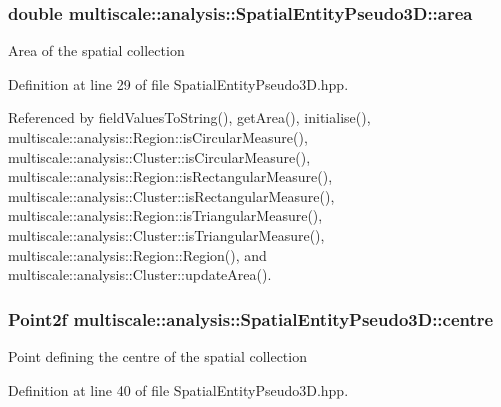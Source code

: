 \hypertarget{classmultiscale_1_1analysis_1_1SpatialEntityPseudo3D_a1621d5b3ece663bf4c5501940e860292}{
\subsubsection[{area}]{\setlength{\rightskip}{0pt plus 5cm}double multiscale\-::analysis\-::\-Spatial\-Entity\-Pseudo3\-D\-::area\hspace{0.3cm}{\ttfamily [protected]}}}\label{classmultiscale_1_1analysis_1_1SpatialEntityPseudo3D_a1621d5b3ece663bf4c5501940e860292}
Area of the spatial collection 

Definition at line 29 of file Spatial\-Entity\-Pseudo3\-D.\-hpp.



Referenced by field\-Values\-To\-String(), get\-Area(), initialise(), multiscale\-::analysis\-::\-Region\-::is\-Circular\-Measure(), multiscale\-::analysis\-::\-Cluster\-::is\-Circular\-Measure(), multiscale\-::analysis\-::\-Region\-::is\-Rectangular\-Measure(), multiscale\-::analysis\-::\-Cluster\-::is\-Rectangular\-Measure(), multiscale\-::analysis\-::\-Region\-::is\-Triangular\-Measure(), multiscale\-::analysis\-::\-Cluster\-::is\-Triangular\-Measure(), multiscale\-::analysis\-::\-Region\-::\-Region(), and multiscale\-::analysis\-::\-Cluster\-::update\-Area().

\hypertarget{classmultiscale_1_1analysis_1_1SpatialEntityPseudo3D_a647c25f9544d5537938bbadefc436634}{
\subsubsection[{centre}]{\setlength{\rightskip}{0pt plus 5cm}Point2f multiscale\-::analysis\-::\-Spatial\-Entity\-Pseudo3\-D\-::centre\hspace{0.3cm}{\ttfamily [protected]}}}\label{classmultiscale_1_1analysis_1_1SpatialEntityPseudo3D_a647c25f9544d5537938bbadefc436634}
Point defining the centre of the spatial collection 

Definition at line 40 of file Spatial\-Entity\-Pseudo3\-D.\-hpp.



